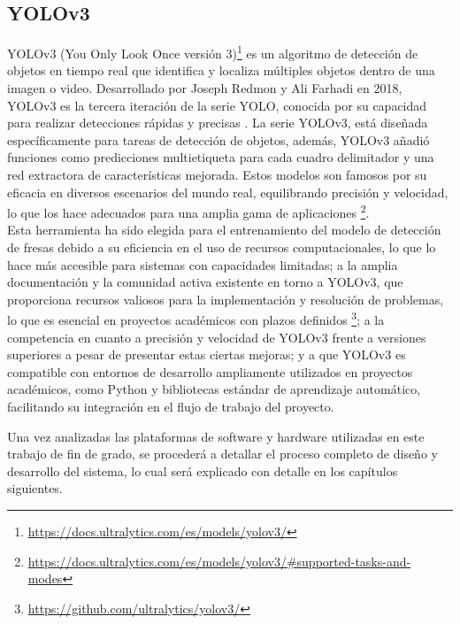 \subsection{YOLOv3}
\label{sec:YOLOv3}

YOLOv3 (You Only Look Once versión 3)\footnote{\url{https://docs.ultralytics.com/es/models/yolov3/}} es un algoritmo de detección de objetos en tiempo real que identifica y localiza múltiples objetos dentro de una imagen o video. Desarrollado por Joseph Redmon y Ali Farhadi en 2018, YOLOv3 es la tercera iteración de la serie YOLO, conocida por su capacidad para realizar detecciones rápidas y precisas \cite{Redmon18}. %
La serie YOLOv3, está diseñada específicamente para tareas de detección de objetos, además, YOLOv3 añadió funciones como predicciones multietiqueta para cada cuadro delimitador y una red extractora de características mejorada. Estos modelos son famosos por su eficacia en diversos escenarios del mundo real, equilibrando precisión y velocidad, lo que los hace adecuados para una amplia gama de aplicaciones \footnote{\url{https://docs.ultralytics.com/es/models/yolov3/\#supported-tasks-and-modes}}.\\

Esta herramienta ha sido elegida para el entrenamiento del modelo de detección de fresas debido a su eficiencia en el uso de recursos computacionales, lo que lo hace más accesible para sistemas con capacidades limitadas; a la amplia documentación y la comunidad activa existente en torno a YOLOv3, que proporciona recursos valiosos para la implementación y resolución de problemas, lo que es esencial en proyectos académicos con plazos definidos \footnote{\url{https://github.com/ultralytics/yolov3/}}; a la competencia en cuanto a precisión y velocidad de YOLOv3 frente a versiones superiores a pesar de presentar estas ciertas mejoras; y a que YOLOv3 es compatible con entornos de desarrollo ampliamente utilizados en proyectos académicos, como Python y bibliotecas estándar de aprendizaje automático, facilitando su integración en el flujo de trabajo del proyecto.

\vspace{20mm}

Una vez analizadas las plataformas de software y hardware utilizadas en este trabajo de fin de grado, se procederá a detallar el proceso completo de diseño y desarrollo del sistema, lo cual será explicado con detalle en los capítulos siguientes.






